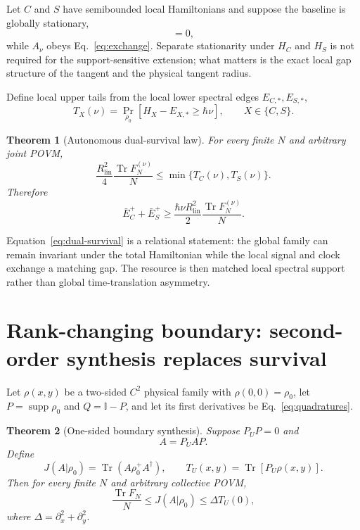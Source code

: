 \documentclass[aps,pra,preprint,nofootinbib]{revtex4-2}
\newtheorem{theorem}{Theorem}
\newcommand{\Tr}{\operatorname{Tr}}
\newcommand{\supp}{\operatorname{supp}}
\newcommand{\id}{\mathbb I}
\newcommand{\Rlin}{R_{\mathrm{lin}}}
\newcommand{\rhozero}{\rho_0}
\newcommand{\Fcl}{F}
\begin{document}
Let $C$ and $S$ have semibounded local Hamiltonians and suppose the baseline is globally stationary,
\begin{equation}
[\rhozero,H_C+H_S]=0,
\end{equation}
while $A_\nu$ obeys Eq.~\eqref{eq:exchange}.  Separate stationarity under $H_C$ and $H_S$ is not required for the support-sensitive extension; what matters is the exact local gap structure of the tangent and the physical tangent radius.

Define local upper tails from the local lower spectral edges $E_{C,*},E_{S,*}$,
\begin{equation}
T_X(\nu)=\Pr_{\rhozero}[H_X-E_{X,*}\ge\hbar\nu],\qquad X\in\{C,S\}.
\end{equation}

\begin{theorem}[Autonomous dual-survival law]
\label{thm:dual-survival}
For every finite $N$ and arbitrary joint POVM,
\begin{equation}
\boxed{
\frac{\Rlin^2}{4}\frac{\Tr \Fcl_N^{(\nu)}}{N}
\le \min\{T_C(\nu),T_S(\nu)\}.
}
\label{eq:dual-survival}
\end{equation}
Therefore
\begin{equation}
\bar E_C^+ +\bar E_S^+
\ge
\frac{\hbar\nu\Rlin^2}{2}
\frac{\Tr \Fcl_N^{(\nu)}}{N}.
\label{eq:dual-energy}
\end{equation}
\end{theorem}

Equation~\eqref{eq:dual-survival} is a relational statement: the global family can remain invariant under the total Hamiltonian while the local signal and clock exchange a matching gap.  The resource is then matched local spectral support rather than global time-translation asymmetry.

\section{Rank-changing boundary: second-order synthesis replaces survival}
\label{sec:boundary}


Let $\rho(x,y)$ be a two-sided $C^2$ physical family with $\rho(0,0)=\rhozero$, let $P=\supp\rhozero$ and $Q=\id-P$, and let its first derivatives be Eq.~\eqref{eq:quadratures}.

\begin{theorem}[One-sided boundary synthesis]
\label{thm:one-sided-boundary}
Suppose $P_U P=0$ and
\begin{equation}
A=P_U A P.
\end{equation}
Define
\begin{equation}
J(A|\rhozero)=\Tr(A\rhozero^+A^\dagger),
\qquad
T_U(x,y)=\Tr[P_U\rho(x,y)].
\end{equation}
Then for every finite $N$ and arbitrary collective POVM,
\begin{equation}
\boxed{
\frac{\Tr \Fcl_N}{N}
\le J(A|\rhozero)
\le \Delta T_U(0),
}
\label{eq:one-sided-boundary}
\end{equation}
where $\Delta=\partial_x^2+\partial_y^2$.
\end{theorem}
\end{document}
